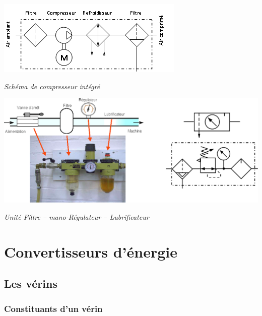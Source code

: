 \documentclass[10pt]{article}
\begin{document}
\begin{minipage}[c]{.47\textwidth}
\begin{center}
\includegraphics[width=.95\textwidth]{images/Fig_01_Compresseur}

\textit{Schéma de compresseur intégré}
\end{center}
\end{minipage} \hfill
\begin{minipage}[c]{.5\textwidth}
\begin{center}
\includegraphics[width=\textwidth]{images/Fig_02_FRL}

\textit{Unité Filtre -- mano-Régulateur -- Lubrificateur}
\end{center}
\end{minipage} 


\section{Convertisseurs d'énergie}
\subsection{Les vérins}
\subsubsection{Constituants d'un vérin}
\end{document}
